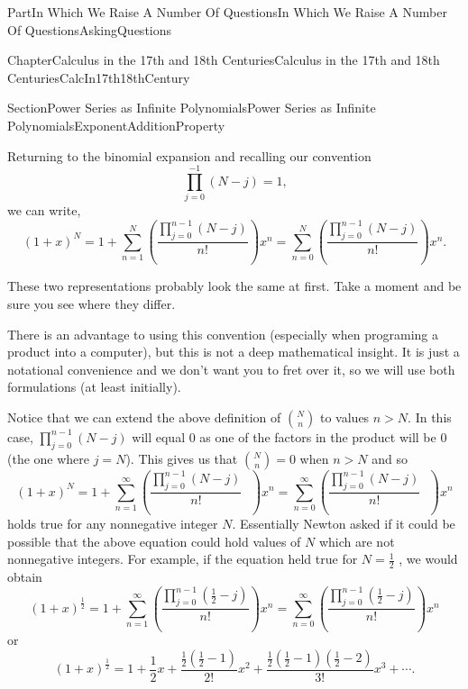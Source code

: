 \documentclass[oneside,10pt,]{book}
\numberwithin{equation}{part}
\begin{document}
\begin{partptx}{Part}{In Which We Raise A Number Of Questions}{}{In Which We Raise A Number Of Questions}{}{}{AskingQuestions}
\begin{chapterptx}{Chapter}{Calculus in the 17th and 18th Centuries}{}{Calculus in the 17th and 18th Centuries}{}{}{CalcIn17th18thCentury}
\begin{sectionptx}{Section}{Power Series as Infinite Polynomials}{}{Power Series as Infinite Polynomials}{}{}{ExponentAdditionProperty}
\par
Returning to the binomial expansion and recalling our convention%
\begin{equation*}
\prod_{j=0}^{-1}\left(N-j\right)=1\text{,}
\end{equation*}
we can write,%
\begin{equation*}
\left(1+x\right)^N=1+\sum_{n=1}^N\left(\frac{\prod_{j=0}^{n-1}\left(N-j\right)}{n!}\right)x^n = \sum_{n=0}^N\left(\frac{\prod_{j=0}^{n-1}\left(N-j\right)}{n!}\right)x^n\text{.}
\end{equation*}
%
\par
These two representations probably look the same at first. Take a moment and be sure you see where they differ.%
\par
There is an advantage to using this convention (especially when programing a product into a computer), but this is not a deep mathematical insight.  It is just a notational convenience and we don't want you to fret over it, so we will use both formulations (at least initially).%
\par
Notice that we can extend the above definition of \(\binom{N}{n}\) to values \(n>N\).  In this case, \(\prod_{j=0}^{n-1}\left(N-j\right)\) will equal 0 as one of the factors in the product will be \(0\) (the one where \(j=N\)).  This gives us that \(\binom{N}{n}=0\) when \(n>N\) and so%
\begin{equation*}
\left(1+x\right)^N=1+\sum_{n=1}^\infty\left(\frac{\prod_{j=0}^{n-1}\left(N-j\right)}{n!}\text{ } \right)x^n= \sum_{n=0}^\infty\left(\frac{\prod_{j=0}^{n-1}\left(N-j\right)}{n!}\text{ } \right)x^n
\end{equation*}
holds true for any nonnegative integer \(N\). Essentially Newton asked if it could be possible that the above equation could hold values of \(N\) which are not nonnegative integers.  For example, if the equation held true for \(N=\frac{1}{2}\) , we would obtain%
\begin{equation*}
\left(1+x\right)^{\frac{1}{2}}=1+\sum_{n=1}^\infty\left(\frac{ \prod_{j=0}^{n-1}\left(\frac{1}{2}-j\right)}{n!}\right)x^n=\sum_{n=0}^\infty\left(\frac{ \prod_{j=0}^{n-1}\left(\frac{1}{2}-j\right)}{n!}\right)x^n
\end{equation*}
or%
\begin{equation}
\left(1+x\right)^{\frac{1}{2}}=1+\frac{1}{2}x+\frac{\frac{1}{2}\left(\frac{1}{2}-1\right)}{2!}x^2+\frac{\frac{1}{2}\left(\frac{1}{2}-1\right)\left(\frac{1}{2}-2\right)}{3!}x^3+\cdots\text{.}\label{eq_BinomialSeries}
\end{equation}

\end{sectionptx}
\end{chapterptx}
\end{partptx}
\end{document}
